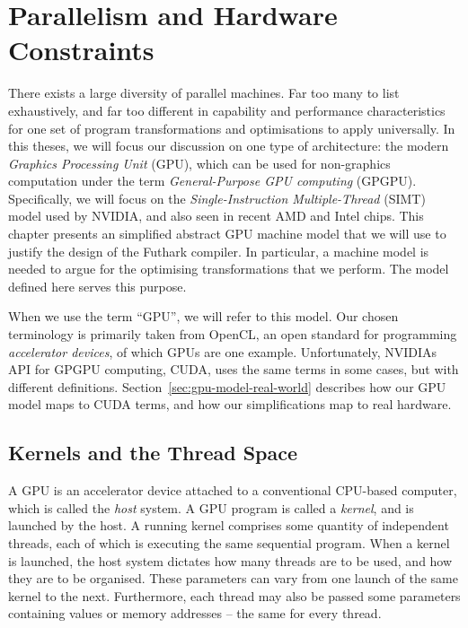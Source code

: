 \chapter{Parallelism and Hardware Constraints}
\label{chap:hardware}

There exists a large diversity of parallel machines.  Far too many to
list exhaustively, and far too different in capability and performance
characteristics for one set of program transformations and
optimisations to apply universally.  In this theses, we will focus our
discussion on one type of architecture: the modern \textit{Graphics
  Processing Unit} (GPU), which can be used for non-graphics
computation under the term \textit{General-Purpose GPU computing}
(GPGPU).  Specifically, we will focus on the
\textit{Single-Instruction Multiple-Thread} (SIMT) model used by
NVIDIA, and also seen in recent AMD and Intel chips.  This chapter
presents an simplified abstract GPU machine model that we will use to
justify the design of the Futhark compiler.  In particular, a machine
model is needed to argue for the optimising transformations that we
perform.  The model defined here serves this purpose.

When we use the term ``GPU'', we will refer to this model.  Our chosen
terminology is primarily taken from OpenCL, an open standard for
programming \textit{accelerator devices}, of which GPUs are one
example.  Unfortunately, NVIDIAs API for GPGPU computing, CUDA, uses
the same terms in some cases, but with different definitions.
Section~\ref{sec:gpu-model-real-world} describes how our GPU model
maps to CUDA terms, and how our simplifications map to real hardware.

\section{Kernels and the Thread Space}

A GPU is an accelerator device attached to a conventional CPU-based
computer, which is called the \textit{host} system.  A GPU program is
called a \textit{kernel}, and is launched by the host.  A running
kernel comprises some quantity of independent threads, each of which
is executing the same sequential program.  When a kernel is launched,
the host system dictates how many threads are to be used, and how they
are to be organised.  These parameters can vary from one launch of the
same kernel to the next.  Furthermore, each thread may also be passed
some parameters containing values or memory addresses -- the same for
every thread.

